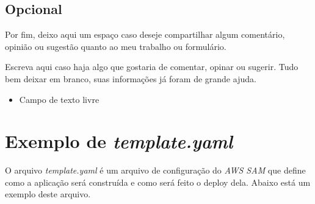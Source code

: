 \begin{apendicesenv}
  \section*{Opcional}

  Por fim, deixo aqui um espaço caso deseje compartilhar algum comentário, opinião ou sugestão quanto ao meu trabalho ou formulário.

  Escreva aqui caso haja algo que gostaria de comentar, opinar ou sugerir. Tudo bem deixar em branco, suas informações já foram de grande ajuda.

  \begin{itemize}
    \item Campo de texto livre
  \end{itemize}

  \chapter{Exemplo de \textit{template.yaml}} \label{apendice:ExemploTemplateYAML}

  O arquivo \textit{template.yaml} é um arquivo de configuração do \textit{AWS SAM} que define como a aplicação será construída e como será feito o deploy dela. Abaixo está um exemplo deste arquivo.

  

\end{apendicesenv}
